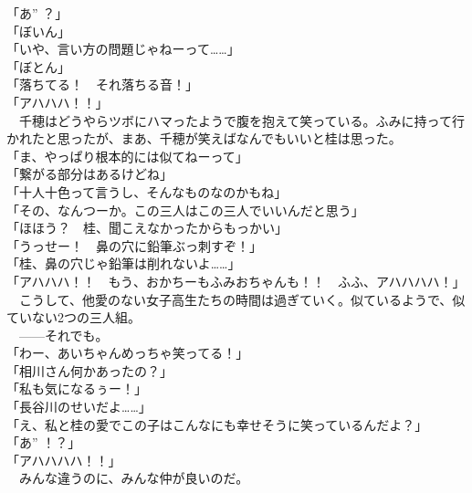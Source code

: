 「あ” ？」\\
「ぼいん」\\
「いや、言い方の問題じゃねーって……」\\
「ぼとん」\\
「落ちてる！　それ落ちる音！」\\
「アハハハ！！」\\
　千穂はどうやらツボにハマったようで腹を抱えて笑っている。ふみに持って行かれたと思ったが、まあ、千穂が笑えばなんでもいいと桂は思った。\\
「ま、やっぱり根本的には似てねーって」\\
「繋がる部分はあるけどね」\\
「十人十色って言うし、そんなものなのかもね」\\
「その、なんつーか。この三人はこの三人でいいんだと思う」\\
「ほほう？　桂、聞こえなかったからもっかい」\\
「うっせー！　鼻の穴に鉛筆ぶっ刺すぞ！」\\
「桂、鼻の穴じゃ鉛筆は削れないよ……」\\
「アハハハ！！　もう、おかちーもふみおちゃんも！！　ふふ、アハハハハ！」\\

　こうして、他愛のない女子高生たちの時間は過ぎていく。似ているようで、似ていない2つの三人組。\\

　——それでも。\\

「わー、あいちゃんめっちゃ笑ってる！」\\
「相川さん何かあったの？」\\
「私も気になるぅー！」\\
「長谷川のせいだよ……」\\
「え、私と桂の愛でこの子はこんなにも幸せそうに笑っているんだよ？」\\
「あ” ！？」\\
「アハハハハ！！」\\

　みんな違うのに、みんな仲が良いのだ。
